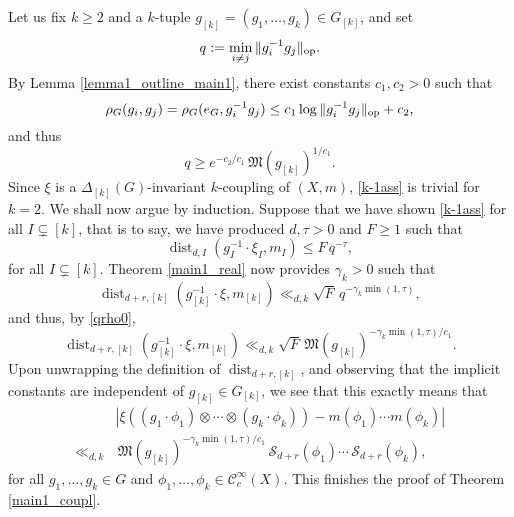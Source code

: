 \documentclass[11pt,reqno,a4paper]{amsart}
\numberwithin{equation}{section}
\newcommand{\cC}{\mathcal{C}}
\newcommand{\cS}{\mathcal{S}}
\newcommand{\eps}{\varepsilon}
\DeclareMathOperator{\dist}{dist}
\theoremstyle{theorem}
\theoremstyle{definition}
\begin{document}
Let us fix $k \geq 2$ and a $k$-tuple $g_{[k]} = (g_1,\ldots,g_k) \in G_{[k]}$, and set
\[
q := \min_{i \neq j} \|g_i^{-1} g_j\|_{\rm op}.
\]
By 
Lemma \ref{lemma1_outline_main1}, there exist constants $c_1,c_2 > 0$ such that
\[
\rho_G(g_i,g_j) = \rho_G(e_G,g_i^{-1} g_j) \leq c_1 \log \|g_i^{-1} g_j\|_{\rm op} + c_2,
\]
and thus
\begin{equation}
\label{qrho0}
q %
\geq e^{-c_2/c_1} \, \mathfrak{M}(g_{[k]})^{1/c_1}.
\end{equation}
Since $\xi$ is a $\Delta_{[k]}(G)$-invariant $k$-coupling of $(X,m)$, \eqref{k-1ass} is trivial for $k = 2$.
We shall now argue by induction. Suppose that we have shown \eqref{k-1ass} for all $I \subsetneq [k]$, that
is to say, we have produced $d, \tau > 0$ and $F\ge 1$ such that
\[
\dist_{d,I}(g_I^{-1} \cdot \xi_I, m_{I}) \leq F\, q^{-\tau},
\]
for all $I \subsetneq [k]$. Theorem \ref{main1_real} now provides $\gamma_k > 0$ such that
\[
\dist_{d+r,[k]}(g_{[k]}^{-1} \cdot \xi,m_{[k]}) \ll_{d,k} \sqrt{F}\, q^{-\gamma_k \min(1,\tau)},
\]
and thus, by \eqref{qrho0}, 
\[
\dist_{d+r,[k]}(g_{[k]}^{-1} \cdot \xi,m_{[k]}) \ll_{d,k} \sqrt{F} \,
\mathfrak{M}(g_{[k]})^{-\gamma_k\min(1,\tau)/c_1}.
\]
Upon unwrapping the definition of $\dist_{d+r,[k]}$, and observing that the implicit constants are independent 
of $g_{[k]} \in G_{[k]}$, we see that this exactly means that
\begin{align*}
&|\xi((g_1 \cdot \phi_1)\otimes \cdots \otimes(g_k \cdot \phi_k)) - m(\phi_1) \cdots m(\phi_k)| \\
\ll_{d,k} &\,
\mathfrak{M}(g_{[k]})^{-\gamma_k\min(1,\tau)/c_1}\,
\cS_{d+r}(\phi_1) \cdots \, \cS_{d+r}(\phi_k),
\end{align*}
for all $g_1,\ldots,g_k \in G$ and $\phi_1, \ldots, \phi_k \in\cC_c^\infty(X)$.
This finishes the proof of 
Theorem \ref{main1_coupl}. \\
\end{document}
